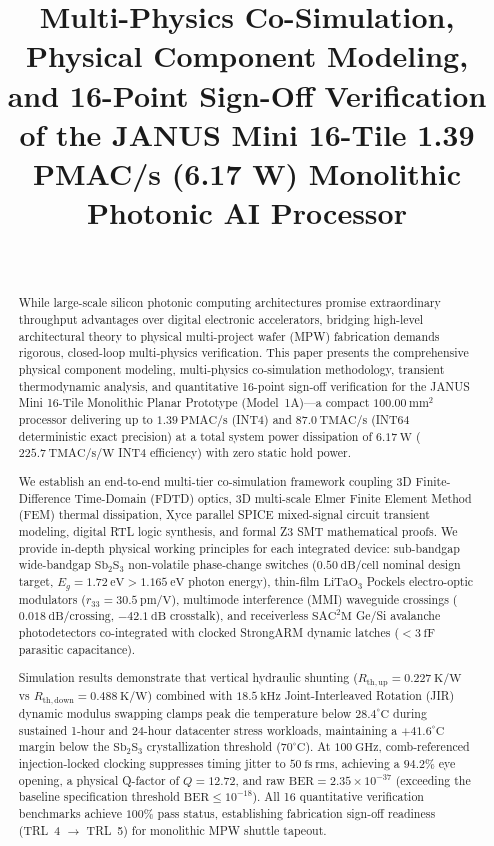 \documentclass[journal]{IEEEtran}
\title{
Multi-Physics Co-Simulation, Physical Component Modeling, and 16-Point Sign-Off Verification of the JANUS Mini 16-Tile 1.39 PMAC/s (6.17 W) Monolithic Photonic AI Processor
}
\author{
\IEEEauthorblockN{Deepanshu Bhardwaj}\\[2pt]
\IEEEauthorblockA{\small Patent Application No.: 202611052791 (Patent Pending)}
}
\begin{document}
\maketitle

\begin{abstract}
While large-scale silicon photonic computing architectures promise extraordinary throughput advantages over digital electronic accelerators, bridging high-level architectural theory to physical multi-project wafer (MPW) fabrication demands rigorous, closed-loop multi-physics verification. This paper presents the comprehensive physical component modeling, multi-physics co-simulation methodology, transient thermodynamic analysis, and quantitative 16-point sign-off verification for the JANUS Mini 16-Tile Monolithic Planar Prototype (Model~1A)---a compact $100.00~\mathrm{mm^2}$ processor delivering up to $1.39~\mathrm{PMAC/s}$ (INT4) and $87.0~\mathrm{TMAC/s}$ (INT64 deterministic exact precision) at a total system power dissipation of $6.17~\mathrm{W}$ ($225.7~\mathrm{TMAC/s/W}$ INT4 efficiency) with zero static hold power. 

We establish an end-to-end multi-tier co-simulation framework coupling 3D Finite-Difference Time-Domain (FDTD) optics, 3D multi-scale Elmer Finite Element Method (FEM) thermal dissipation, Xyce parallel SPICE mixed-signal circuit transient modeling, digital RTL logic synthesis, and formal Z3 SMT mathematical proofs. We provide in-depth physical working principles for each integrated device: sub-bandgap wide-bandgap $\mathrm{Sb_2S_3}$ non-volatile phase-change switches ($0.50~\mathrm{dB/cell}$ nominal design target, $E_g = 1.72~\mathrm{eV} > 1.165~\mathrm{eV}$ photon energy), thin-film $\mathrm{LiTaO_3}$ Pockels electro-optic modulators ($r_{33} = 30.5~\mathrm{pm/V}$), multimode interference (MMI) waveguide crossings ($0.018~\mathrm{dB/crossing}$, $-42.1~\mathrm{dB}$ crosstalk), and receiverless $\mathrm{SAC^2M}$ Ge/Si avalanche photodetectors co-integrated with clocked StrongARM dynamic latches ($<3~\mathrm{fF}$ parasitic capacitance). 

Simulation results demonstrate that vertical hydraulic shunting ($R_{\mathrm{th,up}} = 0.227~\mathrm{K/W}$ vs $R_{\mathrm{th,down}} = 0.488~\mathrm{K/W}$) combined with $18.5~\mathrm{kHz}$ Joint-Interleaved Rotation (JIR) dynamic modulus swapping clamps peak die temperature below $28.4^\circ\mathrm{C}$ during sustained 1-hour and 24-hour datacenter stress workloads, maintaining a $+41.6^\circ\mathrm{C}$ margin below the $\mathrm{Sb_2S_3}$ crystallization threshold ($70^\circ\mathrm{C}$). At $100~\mathrm{GHz}$, comb-referenced injection-locked clocking suppresses timing jitter to $50~\mathrm{fs~rms}$, achieving a $94.2\%$ eye opening, a physical Q-factor of $Q = 12.72$, and raw $\mathrm{BER} = 2.35 \times 10^{-37}$ (exceeding the baseline specification threshold $\mathrm{BER} \le 10^{-18}$). All 16 quantitative verification benchmarks achieve $100\%$ pass status, establishing fabrication sign-off readiness (TRL~4 $\to$ TRL~5) for monolithic MPW shuttle tapeout.
\end{abstract}
\end{document}
